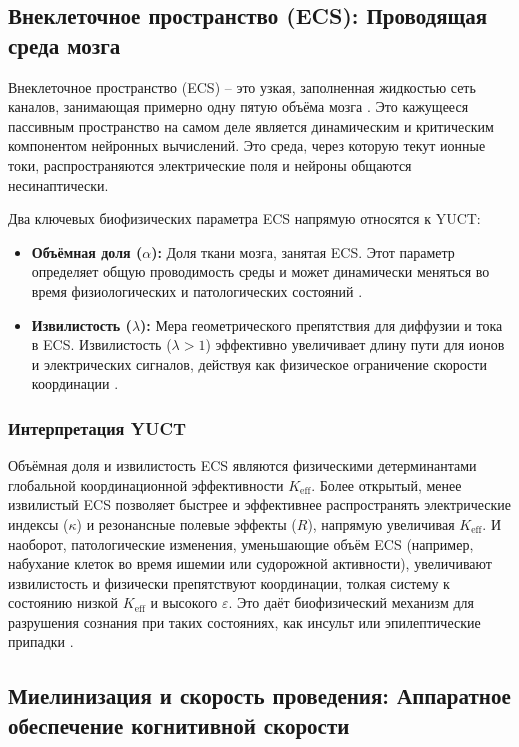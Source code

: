 \documentclass[12pt,a4paper]{article}
\begin{document}
	\subsection{Внеклеточное пространство (ECS): Проводящая среда мозга}
	
	Внеклеточное пространство (ECS) – это узкая, заполненная жидкостью сеть каналов, занимающая примерно одну пятую объёма мозга \cite{Nicholson2006}. Это кажущееся пассивным пространство на самом деле является динамическим и критическим компонентом нейронных вычислений. Это среда, через которую текут ионные токи, распространяются электрические поля и нейроны общаются несинаптически.
	
	Два ключевых биофизических параметра ECS напрямую относятся к YUCT:
	
	\begin{itemize}
		\item \textbf{Объёмная доля (\(\alpha\)):} Доля ткани мозга, занятая ECS. Этот параметр определяет общую проводимость среды и может динамически меняться во время физиологических и патологических состояний \cite{Sykova2008}.
		\item \textbf{Извилистость (\(\lambda\)):} Мера геометрического препятствия для диффузии и тока в ECS. Извилистость (\(\lambda > 1\)) эффективно увеличивает длину пути для ионов и электрических сигналов, действуя как физическое ограничение скорости координации \cite{Nicholson2006}.
	\end{itemize}
	
	\subsubsection*{Интерпретация YUCT}
	Объёмная доля и извилистость ECS являются физическими детерминантами глобальной координационной эффективности \(K_{\mathrm{eff}}\). Более открытый, менее извилистый ECS позволяет быстрее и эффективнее распространять электрические индексы (\(\kappa\)) и резонансные полевые эффекты (\(R\)), напрямую увеличивая \(K_{\mathrm{eff}}\). И наоборот, патологические изменения, уменьшающие объём ECS (например, набухание клеток во время ишемии или судорожной активности), увеличивают извилистость и физически препятствуют координации, толкая систему к состоянию низкой \(K_{\mathrm{eff}}\) и высокого \(\varepsilon\). Это даёт биофизический механизм для разрушения сознания при таких состояниях, как инсульт или эпилептические припадки \cite{Arranz2023}.
	
	\subsection{Миелинизация и скорость проведения: Аппаратное обеспечение когнитивной скорости}
	
\end{document}

